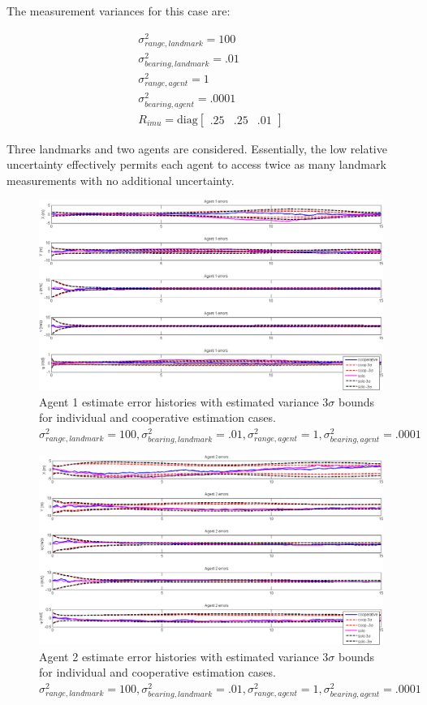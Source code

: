 \documentclass{aiaa-tc}
\newcommand{\tvecth}[3]{\begin{bmatrix}#1&#2&#3\end{bmatrix}}%
\begin{document}
The measurement variances for this case are:

\begin{eqnarray}
\sigma^2_{range,landmark} = 100 \\
\sigma^2_{bearing,landmark} = .01\\
\sigma^2_{range,agent} = 1 \\
\sigma^2_{bearing,agent} = .0001\\
R_{imu} = \mathrm{diag}\tvecth{.25}{.25}{.01}
\end{eqnarray}

Three landmarks and two agents are considered. Essentially, the low relative uncertainty effectively permits each agent to access twice as many landmark measurements with no additional uncertainty.

\begin{figure}[p]
\centering
\includegraphics[height=0.4\textheight]{../good_relative_agent1.png}
\caption{Agent 1 estimate error histories with estimated variance 3$\sigma$ bounds for individual and cooperative estimation cases. $\sigma^2_{range,landmark} = 100,\sigma^2_{bearing,landmark} = .01,\sigma^2_{range,agent} = 1,\sigma^2_{bearing,agent} = .0001$}
\label{fig:good_relative_agent1}
\end{figure}

\begin{figure}[p]
\centering
\includegraphics[height=0.4\textheight]{../good_relative_agent2.png}
\caption{Agent 2 estimate error histories with estimated variance 3$\sigma$ bounds for individual and cooperative estimation cases. $\sigma^2_{range,landmark} = 100,\sigma^2_{bearing,landmark} = .01,\sigma^2_{range,agent} = 1,\sigma^2_{bearing,agent} = .0001$}
\label{fig:good_relative_agent2}
\end{figure}
\end{document}
